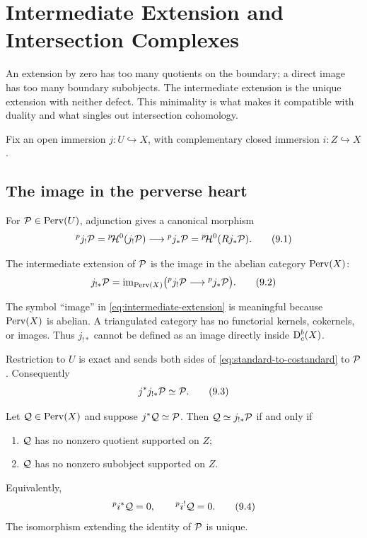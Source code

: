 \chapter{Intermediate Extension and Intersection Complexes}
\label{chap:intermediate-extension}

An extension by zero has too many quotients on the boundary; a direct image
has too many boundary subobjects.  The intermediate extension is the unique
extension with neither defect.  This minimality is what makes it compatible
with duality and what singles out intersection cohomology.

Fix an open immersion \(j:U\hookrightarrow X\), with complementary closed
immersion \(i:Z\hookrightarrow X\).

\section{The image in the perverse heart}

For \(\mathcal P\in\operatorname{Perv}(U)\), adjunction gives a canonical morphism
\[
  {}^pj_!\mathcal P={}^{p}\!\mathcal H^0(j_!\mathcal P)
  \longrightarrow
  {}^pj_*\mathcal P={}^{p}\!\mathcal H^0(Rj_*\mathcal P).
\tag{9.1}\label{eq:standard-to-costandard}
\]

\begin{definition}
\label{def:intermediate-extension}
The intermediate extension of \(\mathcal P\) is the image in the abelian category
\(\operatorname{Perv}(X)\):
\[
  j_{!*}\mathcal P
  =
  \operatorname{im}_{\operatorname{Perv}(X)}
  \bigl({}^pj_!\mathcal P\longrightarrow{}^pj_*\mathcal P\bigr).
\tag{9.2}\label{eq:intermediate-extension}
\]
\end{definition}

\begin{warning}
The symbol “image” in \eqref{eq:intermediate-extension} is meaningful because
\(\operatorname{Perv}(X)\) is abelian.  A triangulated category has no functorial kernels,
cokernels, or images.  Thus \(j_{!*}\) cannot be defined as an image directly
inside \(\mathrm D^b_c(X)\).
\end{warning}

Restriction to \(U\) is exact and sends both sides of
\eqref{eq:standard-to-costandard} to \(\mathcal P\).  Consequently
\[
  j^*j_{!*}\mathcal P\simeq\mathcal P.
\tag{9.3}\label{eq:jstar-jmiddle}
\]

\begin{theorem}
\label{thm:minimal-extension-characterization}
Let \(\mathcal Q\in\operatorname{Perv}(X)\) and suppose \(j^*\mathcal Q\simeq\mathcal P\).  Then
\(\mathcal Q\simeq j_{!*}\mathcal P\) if and only if
\begin{enumerate}
\item \(\mathcal Q\) has no nonzero quotient supported on \(Z\);
\item \(\mathcal Q\) has no nonzero subobject supported on \(Z\).
\end{enumerate}
Equivalently,
\[
  {}^pi^*\mathcal Q=0,\qquad {}^pi^!\mathcal Q=0.
\tag{9.4}\label{eq:middle-boundary-vanishing}
\]
The isomorphism extending the identity of \(\mathcal P\) is unique.
\end{theorem}

